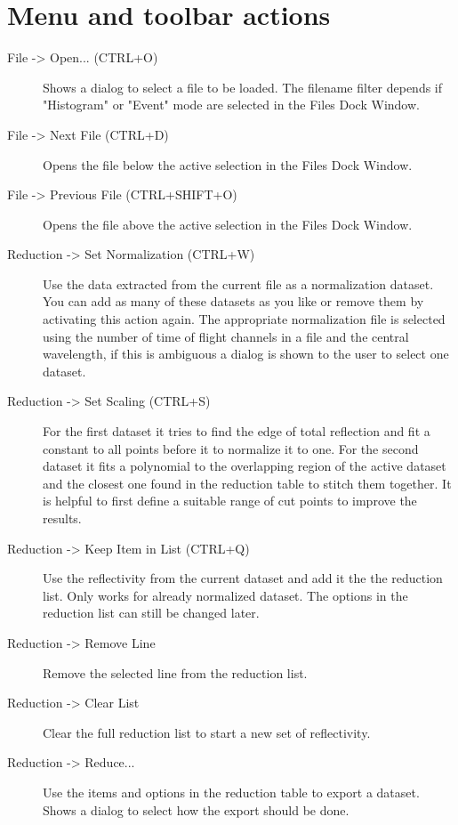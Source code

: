 \section{Menu and toolbar actions}
  
  \begin{description}
   \item[{ File -> Open... (CTRL+O)}] Shows a dialog to select a file to be loaded. The filename filter depends if "Histogram" or "Event" mode are selected in the Files Dock Window.
   \item[{ File -> Next File (CTRL+D)}] Opens the file below the active selection in the Files Dock Window.
   \item[{ File -> Previous File (CTRL+SHIFT+O)}] Opens the file above the active selection in the Files Dock Window.
   
   \item[{ Reduction -> Set Normalization (CTRL+W)}] Use the data extracted from the current file as a normalization dataset. You can add as many of these datasets as you like or remove them by activating this action again. The appropriate normalization file is selected using the number of time of flight channels in a file and the central wavelength, if this is ambiguous a dialog is shown to the user to select one dataset.
   \item[{ Reduction -> Set Scaling (CTRL+S)}] For the first dataset it tries to find the edge of total reflection and fit a constant to all points before it to normalize it to one. For the second dataset it fits a polynomial to the overlapping region of the active dataset and the closest one found in the reduction table to stitch them together. It is helpful to first define a suitable range of cut points to improve the results.
   
   \item[{ Reduction -> Keep Item in List (CTRL+Q)}] Use the reflectivity from the current dataset and add it the the reduction list. Only works for already normalized dataset. The options in the reduction list can still be changed later.
   \item[{ Reduction -> Remove Line}] Remove the selected line from the reduction list.
   \item[{ Reduction -> Clear List}] Clear the full reduction list to start a new set of reflectivity.

    \item[{ Reduction -> Reduce...}] Use the items and options in the reduction table to export a dataset. Shows a dialog to select how the export should be done.


\end{description}
